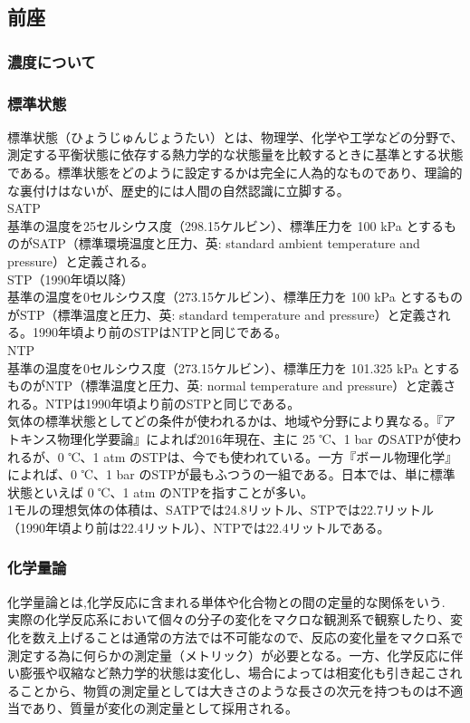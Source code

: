 \documentclass[dvipdfmx,uplatex]{jsarticle}
\begin{document}
\subsection{前座}
	\subsubsection{濃度について}
	\subsubsection{標準状態}
標準状態（ひょうじゅんじょうたい）とは、物理学、化学や工学などの分野で、測定する平衡状態に依存する熱力学的な状態量を比較するときに基準とする状態である。標準状態をどのように設定するかは完全に人為的なものであり、理論的な裏付けはないが、歴史的には人間の自然認識に立脚する。 \\
{\large SATP} \\
基準の温度を25セルシウス度（298.15ケルビン）、標準圧力を 100 kPa とするものがSATP（標準環境温度と圧力、英: standard ambient temperature and pressure）と定義される。 \\
{\large STP（1990年頃以降）} \\
基準の温度を0セルシウス度（273.15ケルビン）、標準圧力を 100 kPa とするものがSTP（標準温度と圧力、英: standard temperature and pressure）と定義される。1990年頃より前のSTPはNTPと同じである。 \\
{\large NTP} \\
基準の温度を0セルシウス度（273.15ケルビン）、標準圧力を 101.325 kPa とするものがNTP（標準温度と圧力、英: normal temperature and pressure）と定義される。NTPは1990年頃より前のSTPと同じである。 \\
気体の標準状態としてどの条件が使われるかは、地域や分野により異なる。『アトキンス物理化学要論』によれば2016年現在、主に 25 ℃、1 bar のSATPが使われるが、0 ℃、1 atm のSTPは、今でも使われている。一方『ボール物理化学』によれば、0 ℃、1 bar のSTPが最もふつうの一組である。日本では、単に標準状態といえば 0 ℃、1 atm のNTPを指すことが多い。 \\
1モルの理想気体の体積は、SATPでは24.8リットル、STPでは22.7リットル（1990年頃より前は22.4リットル）、NTPでは22.4リットルである。

	\subsubsection{化学量論}
化学量論とは,化学反応に含まれる単体や化合物との間の定量的な関係をいう. \\
実際の化学反応系において個々の分子の変化をマクロな観測系で観察したり、変化を数え上げることは通常の方法では不可能なので、反応の変化量をマクロ系で測定する為に何らかの測定量（メトリック）が必要となる。一方、化学反応に伴い膨張や収縮など熱力学的状態は変化し、場合によっては相変化も引き起こされることから、物質の測定量としては大きさのような長さの次元を持つものは不適当であり、質量が変化の測定量として採用される。 \\
\end{document}
